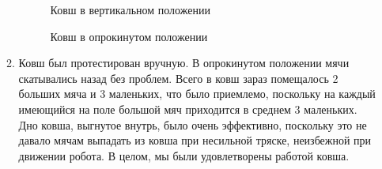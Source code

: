 \begin{enumerate}
\begin{enumerate}
	    \begin{figure}[H]
			\begin{minipage}[h]{0.47\linewidth}
				\caption{Ковш в вертикальном положении}
			\end{minipage}
			\hfill
			\begin{minipage}[h]{0.47\linewidth}
				\caption{Ковш в опрокинутом положении}
			\end{minipage}
		\end{figure}
		
		
		\item Ковш был протестирован вручную. В опрокинутом положении мячи скатывались назад без проблем. Всего в ковш зараз помещалось 2 больших мяча и 3 маленьких, что было приемлемо, поскольку на каждый имеющийся на поле большой мяч приходится в среднем 3 маленьких. Дно ковша, выгнутое внутрь, было очень эффективно, поскольку это не давало мячам выпадать из ковша при несильной тряске, неизбежной при движении робота. В целом, мы были удовлетворены работой ковша.
		

\end{enumerate}
\end{enumerate}
